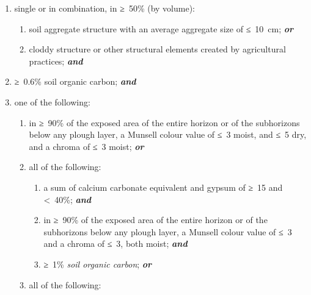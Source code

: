 \documentclass[
  letterpaper,
  DIV=11,
  numbers=noendperiod]{scrreprt}
\providecommand{\tightlist}{%
  \setlength{\itemsep}{0pt}\setlength{\parskip}{0pt}}\usepackage{longtable,booktabs,array}
\begin{document}
\begin{enumerate}
\def\labelenumi{\arabic{enumi}.}
\tightlist
\item
  single or in combination, in ≥~50\% (by volume):

  \begin{enumerate}
  \def\labelenumii{\alph{enumii}.}
  \tightlist
  \item
    soil aggregate structure with an average aggregate size of ≤~10~cm;
    \textbf{\emph{or}}
  \item
    cloddy structure or other structural elements created by
    agricultural practices; \textbf{\emph{and}}
  \end{enumerate}
\item
  ≥~0.6\% soil organic carbon; \textbf{\emph{and}}
\item
  one of the following:

  \begin{enumerate}
  \def\labelenumii{\alph{enumii}.}
  \tightlist
  \item
    in ≥~90\% of the exposed area of the entire horizon or of the
    subhorizons below any plough layer, a Munsell colour value of ≤~3
    moist, and ≤~5 dry, and a chroma of ≤~3 moist; \textbf{\emph{or}}
  \item
    all of the following:

    \begin{enumerate}
    \def\labelenumiii{\roman{enumiii}.}
    \item
      a sum of calcium carbonate equivalent and gypsum of ≥~15 and
      \textless~40\%; \textbf{\emph{and}}
    \item
      in ≥~90\% of the exposed area of the entire horizon or of the
      subhorizons below any plough layer, a Munsell colour value of ≤~3
      and a chroma of ≤~3, both moist; \textbf{\emph{and}}
    \item
      ≥~1\% \emph{soil organic carbon}; \textbf{\emph{or}}
    \end{enumerate}
  \item
    all of the following:


\end{enumerate}
\end{enumerate}
\end{document}
